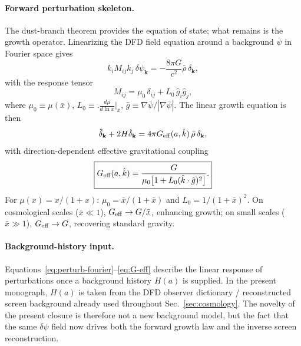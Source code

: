 \paragraph{Forward perturbation skeleton.}
The dust-branch theorem provides the equation of state; what remains is the growth operator.  Linearizing the DFD field equation around a background $\bar\psi$ in Fourier space gives
\begin{equation}\label{eq:perturb-fourier}
k_i M_{ij} k_j\,\delta\psi_{\mathbf{k}} = -\frac{8\pi G}{c^2}\bar\rho\,\delta_{\mathbf{k}},
\end{equation}
with the response tensor
\begin{equation}\label{eq:M-tensor}
M_{ij} = \mu_0\,\delta_{ij} + L_0\,\hat{g}_i\hat{g}_j,
\end{equation}
where
$\mu_0 \equiv \mu(\bar{x})$,\;
$L_0 \equiv \bigl.\frac{d\mu}{d\ln x}\bigr|_{\bar{x}}$,\;
$\hat{g} \equiv \nabla\bar\psi/|\nabla\bar\psi|$.
The linear growth equation is then
\begin{equation}\label{eq:growth-Geff}
\ddot\delta_{\mathbf{k}} + 2H\dot\delta_{\mathbf{k}} = 4\pi G_{\rm eff}(a,\hat{k})\,\bar\rho\,\delta_{\mathbf{k}},
\end{equation}
with direction-dependent effective gravitational coupling
\begin{equation}\label{eq:G-eff}
\boxed{G_{\rm eff}(a,\hat{k}) = \frac{G}{\mu_0\big[1 + L_0(\hat{k}\cdot\hat{g})^2\big]}.}
\end{equation}
For $\mu(x)=x/(1+x)$: $\mu_0 = \bar{x}/(1+\bar{x})$ and $L_0 = 1/(1+\bar{x})^2$.  On cosmological scales ($\bar{x} \ll 1$), $G_{\rm eff} \to G/\bar{x}$, enhancing growth; on small scales ($\bar{x} \gg 1$), $G_{\rm eff} \to G$, recovering standard gravity.

\paragraph{Background-history input.}
Equations~\eqref{eq:perturb-fourier}--\eqref{eq:G-eff} describe the linear response of perturbations once a background history $H(a)$ is supplied.  In the present monograph, $H(a)$ is taken from the DFD observer dictionary / reconstructed screen background already used throughout Sec.~\ref{sec:cosmology}.  The novelty of the present closure is therefore not a new background model, but the fact that the same $\delta\psi$ field now drives both the forward growth law and the inverse screen reconstruction.

